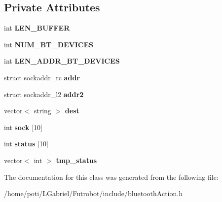 \subsection*{Private Attributes}
\begin{DoxyCompactItemize}
\item 
int {\bfseries L\+E\+N\+\_\+\+B\+U\+F\+F\+ER}\hypertarget{classBluetoothAction_a4eba4bd75e5bb6623a3d3b98b2c19668}{}\label{classBluetoothAction_a4eba4bd75e5bb6623a3d3b98b2c19668}

\item 
int {\bfseries N\+U\+M\+\_\+\+B\+T\+\_\+\+D\+E\+V\+I\+C\+ES}\hypertarget{classBluetoothAction_ae9d8fac063bb06fa7549d4351af121ef}{}\label{classBluetoothAction_ae9d8fac063bb06fa7549d4351af121ef}

\item 
int {\bfseries L\+E\+N\+\_\+\+A\+D\+D\+R\+\_\+\+B\+T\+\_\+\+D\+E\+V\+I\+C\+ES}\hypertarget{classBluetoothAction_a8b8ebb8e091c6f24a410956b8caf59f2}{}\label{classBluetoothAction_a8b8ebb8e091c6f24a410956b8caf59f2}

\item 
struct sockaddr\+\_\+rc {\bfseries addr}\hypertarget{classBluetoothAction_ae1f63aede68137664723cdcb0bb3eeb6}{}\label{classBluetoothAction_ae1f63aede68137664723cdcb0bb3eeb6}

\item 
struct sockaddr\+\_\+l2 {\bfseries addr2}\hypertarget{classBluetoothAction_a584369a978be91fd40a32ed59d059a7d}{}\label{classBluetoothAction_a584369a978be91fd40a32ed59d059a7d}

\item 
vector$<$ string $>$ {\bfseries dest}\hypertarget{classBluetoothAction_a5e3cfe4f682dcabbe5e5aca246636b8e}{}\label{classBluetoothAction_a5e3cfe4f682dcabbe5e5aca246636b8e}

\item 
int {\bfseries sock} \mbox{[}10\mbox{]}\hypertarget{classBluetoothAction_a6c057b0c3a29702013589753547cbf5e}{}\label{classBluetoothAction_a6c057b0c3a29702013589753547cbf5e}

\item 
int {\bfseries status} \mbox{[}10\mbox{]}\hypertarget{classBluetoothAction_af203e239a609db0307698a87f7afae05}{}\label{classBluetoothAction_af203e239a609db0307698a87f7afae05}

\item 
vector$<$ int $>$ {\bfseries tmp\+\_\+status}\hypertarget{classBluetoothAction_a6a3b02c3c710a60f38adce9518bcb525}{}\label{classBluetoothAction_a6a3b02c3c710a60f38adce9518bcb525}

\end{DoxyCompactItemize}


The documentation for this class was generated from the following file\+:\begin{DoxyCompactItemize}
\item 
/home/poti/\+L\+Gabriel/\+Futrobot/include/bluetooth\+Action.\+h\end{DoxyCompactItemize}
